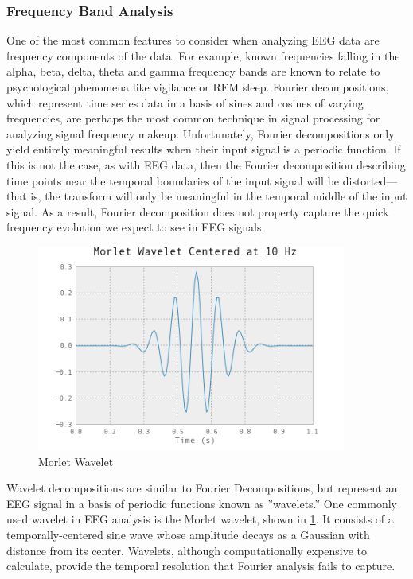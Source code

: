 \documentclass[12pt]{report}
\begin{document}
	
\subsubsection{Frequency Band Analysis}
	One of the most common features to consider when analyzing EEG data are frequency components of the data.  For example, known frequencies falling in the alpha, beta, delta, theta and gamma frequency bands are known to relate to psychological phenomena like vigilance or REM sleep.   Fourier decompositions, which represent time series data in a basis of sines and cosines of varying frequencies, are perhaps the most common technique in signal processing for analyzing signal frequency makeup.  Unfortunately, Fourier decompositions only yield entirely meaningful results when their input signal is a periodic function.   If this is not the case, as with EEG data, then the Fourier decomposition describing time points near the temporal boundaries of the input signal will be distorted—that is, the transform will only be meaningful in the temporal middle of the input signal.  As a result, Fourier decomposition does not property capture the quick frequency evolution we expect to see in EEG signals.  

\begin{figure}[t]
\centering
\includegraphics[width=4in]{morletwavelet}
\caption{Morlet Wavelet \label{morlet}}
\end{figure}


	Wavelet decompositions are similar to Fourier Decompositions, but represent an EEG signal in a basis of periodic functions known as ''wavelets.''  One commonly used wavelet in EEG analysis is the Morlet wavelet, shown in \ref{morlet}.  It consists of a temporally-centered sine wave whose amplitude decays as a Gaussian with distance from its center.  Wavelets, although computationally expensive to calculate, provide the temporal resolution that Fourier analysis fails to capture.  
\end{document}
